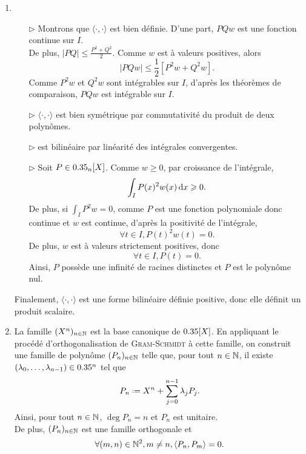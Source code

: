 \begin{solution}
    \begin{enumerate}
        \item 
        \begin{itemize}
            \item[$\rhd$] Montrons que $\langle \cdot, \cdot \rangle$ est bien définie. D'une part, $PQw$ est une fonction continue sur $I$. \\
            De plus, $|PQ| \leqslant \frac{P^2 + Q^2}{2}$. Comme $w$ est à valeurs positives, alors
            $$|PQw| \leqslant \frac{1}{2} \left[ P^2 w + Q^2 w\right].$$
            Comme $P^2 w$ et $Q^2 w$ sont intégrables sur $I$, d'après les théorèmes de comparaison, $PQw$ est intégrable sur $I$.
            \item[$\rhd$] $\langle \cdot, \cdot \rangle$ est bien symétrique par commutativité du produit de deux polynômes. 
            \item[$\rhd$] est bilinéaire par linéarité des intégrales convergentes.
            \item[$\rhd$] Soit $P \in 0.35_n[X]$. Comme $w \geqslant 0$, par croissance de l'intégrale, 
            $$\int_I P(x)^2 w(x) \, \mathrm{d} x \geqslant 0.$$
            De plus, si $\displaystyle \int_I P^2 w = 0$, comme $P$ est une fonction polynomiale donc continue et $w$ est continue, d'après la positivité de l'intégrale,
            $$\forall t \in I, P(t)^2 w(t) = 0.$$
            De plus, $w$ est à valeurs strictement positives, donc
            $$\forall t \in I, P(t) = 0.$$
            Ainsi, $P$ possède une infinité de racines distinctes et $P$ est le polynôme nul.
        \end{itemize}
        Finalement, $\langle \cdot, \cdot \rangle$ est une forme bilinéaire définie positive, donc elle définit un produit scalaire. 
        \item La famille $(X^n)_{n \in \mathbb{N}}$ est la base canonique de $0.35[X]$. En appliquant le procédé d'orthogonalisation de \textsc{Gram}-\textsc{Schmidt} à cette famille, on construit une famille de polynôme $(P_n)_{n \in \mathbb{N}}$ telle que, pour tout $n \in \mathbb{N}$, il existe $(\lambda_0, \dots, \lambda_{n-1}) \in 0.35^n$ tel que
        $$P_n \defeq X^n + \sum_{j=0}^{n-1} \lambda_j P_j.$$
        Ainsi, pour tout $n \in \mathbb{N}$, $\deg P_n = n$ et $P_n$ est unitaire. \\
        De plus, $(P_n)_{n \in \mathbb{N}}$ est une famille orthogonale et 
        $$\forall (m, n) \in \mathbb{N}^2, m \not= n, \langle P_n, P_m \rangle = 0.$$

\end{enumerate}
\end{solution}

